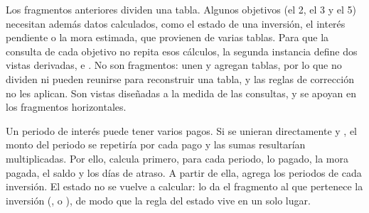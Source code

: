 Los fragmentos anteriores dividen una tabla. Algunos objetivos (el 2, el 3 y el 5) necesitan adem\'as datos calculados, como el estado de una inversi\'on, el inter\'es pendiente o la mora estimada, que provienen de varias tablas. Para que la consulta de cada objetivo no repita esos c\'alculos, la segunda instancia define dos vistas derivadas,  e . No son fragmentos: unen y agregan tablas, por lo que no dividen ni pueden reunirse para reconstruir una tabla, y las reglas de correcci\'on no les aplican. Son vistas dise\~nadas a la medida de las consultas, y se apoyan en los fragmentos horizontales.

Un periodo de inter\'es puede tener varios pagos. Si se unieran directamente  y , el monto del periodo se repetir\'ia por cada pago y las sumas resultar\'ian multiplicadas. Por ello,  calcula primero, para cada periodo, lo pagado, la mora pagada, el saldo y los d\'ias de atraso. A partir de ella,  agrega los periodos de cada inversi\'on. El estado no se vuelve a calcular: lo da el fragmento al que pertenece la inversi\'on (,  o ), de modo que la regla del estado vive en un solo lugar.

